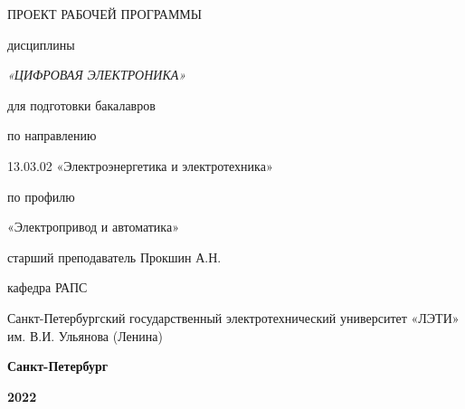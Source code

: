 
\hypersetup{
colorlinks=false,
}
\usepackage{textcomp}

\graphicspath{{images/}}





%
%
%
%

\vspace{5cm}

\begin{center}
ПРОЕКТ РАБОЧЕЙ ПРОГРАММЫ

дисциплины

\emph{«ЦИФРОВАЯ ЭЛЕКТРОНИКА»}

для подготовки бакалавров

по направлению

13.03.02 «Электроэнергетика и электротехника»

по профилю

«Электропривод и автоматика»

\vspace{5cm}
старший преподаватель Прокшин А.Н.

\vspace{0.4cm}

кафедра РАПС

\vspace{0.4cm}

Санкт-Петербургский государственный электротехнический университет «ЛЭТИ» им. В.И. Ульянова (Ленина)

\vspace{8cm}

\textbf{Санкт-Петербург}

\textbf{2022}
\end{center}

